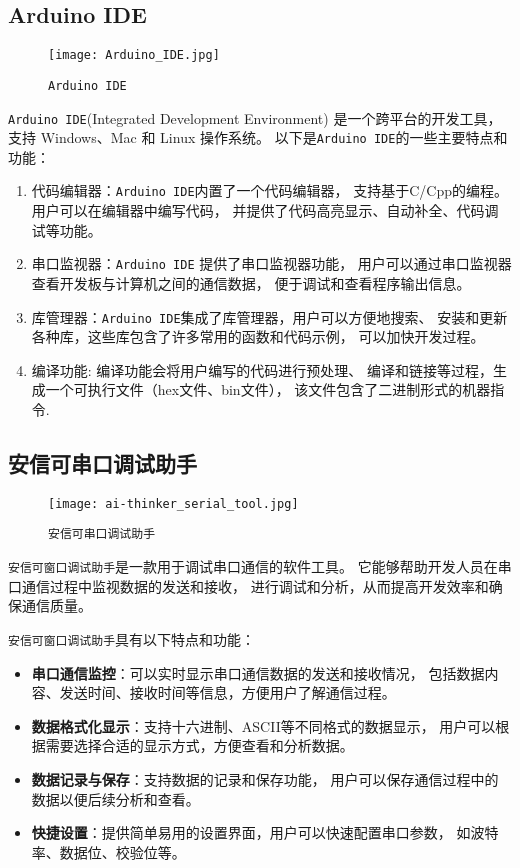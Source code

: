 \documentclass[../main.tex]{subfiles}
\begin{document}
\subsection*{Arduino IDE}
\begin{figure}[H]
  \begin{center}
    \texttt{[image: Arduino\_IDE.jpg]}
  \end{center}
  \caption{\texttt{Arduino IDE}}
\end{figure}
%
\texttt{Arduino IDE}(Integrated Development Environment) 是一个跨平台的开发工具，支持 Windows、Mac 和 Linux 操作系统。
以下是\texttt{Arduino IDE}的一些主要特点和功能：
\begin{enumerate}
  \item 代码编辑器：\texttt{Arduino IDE}内置了一个代码编辑器，
    支持基于C/Cpp的编程。用户可以在编辑器中编写代码，
    并提供了代码高亮显示、自动补全、代码调试等功能。
  \item 串口监视器：\texttt{Arduino IDE} 提供了串口监视器功能，
    用户可以通过串口监视器查看开发板与计算机之间的通信数据，
    便于调试和查看程序输出信息。
  \item 库管理器：\texttt{Arduino IDE}集成了库管理器，用户可以方便地搜索、
    安装和更新各种库，这些库包含了许多常用的函数和代码示例，
    可以加快开发过程。
  \item 编译功能: 编译功能会将用户编写的代码进行预处理、
    编译和链接等过程，生成一个可执行文件（hex文件、bin文件），
    该文件包含了二进制形式的机器指令.
\end{enumerate}
%
\subsection*{安信可串口调试助手}
\begin{figure}[H]
  \begin{center}
    \texttt{[image: ai-thinker\_serial\_tool.jpg]}
  \end{center}
  \caption{\texttt{安信可串口调试助手}}
\end{figure}
%
\texttt{安信可窗口调试助手}是一款用于调试串口通信的软件工具。
它能够帮助开发人员在串口通信过程中监视数据的发送和接收，
进行调试和分析，从而提高开发效率和确保通信质量。

\texttt{安信可窗口调试助手}具有以下特点和功能：
\begin{itemize}
  \item \textbf{串口通信监控}：可以实时显示串口通信数据的发送和接收情况，
    包括数据内容、发送时间、接收时间等信息，方便用户了解通信过程。
  \item \textbf{数据格式化显示}：支持十六进制、ASCII等不同格式的数据显示，
    用户可以根据需要选择合适的显示方式，方便查看和分析数据。
  \item \textbf{数据记录与保存}：支持数据的记录和保存功能，
    用户可以保存通信过程中的数据以便后续分析和查看。
  \item \textbf{快捷设置}：提供简单易用的设置界面，用户可以快速配置串口参数，
    如波特率、数据位、校验位等。
\end{itemize}
\end{document}
